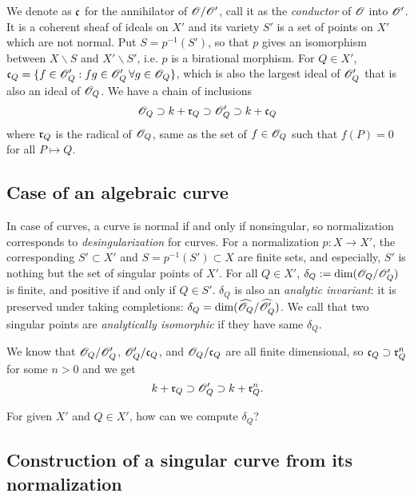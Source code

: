 \documentclass[letterpaper, 12pt]{article}
\begin{document}
We denote as $\mathfrak{c}$ for the annihilator of $\mathscr{O} / \mathscr{O}'$, call it as the \emph{conductor} of $\mathscr{O}$ into $\mathscr{O}'$.
It is a coherent sheaf of ideals on $X'$ and its variety $S'$ is a set of points on $X'$ which are not normal.
Put $S = p^{-1}(S')$, so that $p$ gives an isomorphism between $X \backslash S$ and $X' \backslash S'$, i.e. $p$ is a birational morphism.
For $Q \in X'$, $\mathfrak{c}_Q = \{f \in \mathscr{O}_Q': fg \in \mathscr{O}_Q' \,\forall g \in \mathscr{O}_Q\}$, which is also the largest ideal of $\mathscr{O}_Q'$ that is also an ideal of $\mathscr{O}_Q$.
We have a chain of inclusions
$$
\mathscr{O}_Q \supset k + \mathfrak{r}_Q \supset \mathscr{O}_Q' \supset k + \mathfrak{c}_Q
$$
where $\mathfrak{r}_Q$ is the radical of $\mathscr{O}_Q$, same as the set of $f \in \mathscr{O}_Q$ such that $f(P) = 0$ for all $P \mapsto Q$.

\subsection{Case of an algebraic curve}

In case of curves, a curve is normal if and only if nonsingular, so normalization corresponds to \emph{desingularization} for curves.
For a normalization $p: X \to X'$, the corresponding $S' \subset X'$ and $S = p^{-1}(S') \subset X$ are finite sets, and especially, $S'$ is nothing but the set of singular points of $X'$.
For all $Q \in X'$, $\delta_Q := \dim(\mathscr{O}_Q / \mathscr{O}'_Q)$ is finite, and positive if and only if $Q \in S'$.
$\delta_Q$ is also an \emph{analytic invariant}: it is preserved under taking completions: $\delta_Q = \dim (\widehat{\mathscr{O}_Q} / \widehat{\mathscr{O}_Q'})$.
We call that two singular points are \emph{analytically isomorphic} if they have same $\delta_Q$.

We know that $\mathscr{O}_Q / \mathscr{O}_Q'$, $\mathscr{O}_Q' / \mathfrak{c}_Q$, and $\mathscr{O}_Q / \mathfrak{c}_Q$ are all finite dimensional, so $\mathfrak{c}_Q \supset \mathfrak{r}_Q^n$ for some $n > 0$ and we get 
\begin{equation}
\label{eqn:rad}
    k + \mathfrak{r}_Q \supset \mathscr{O}_Q' \supset k + \mathfrak{r}_Q^n.
\end{equation}

\begin{question}
For given $X'$ and $Q \in X'$, how can we compute $\delta_Q$?
\end{question}

\subsection{Construction of a singular curve from its normalization}
\end{document}
